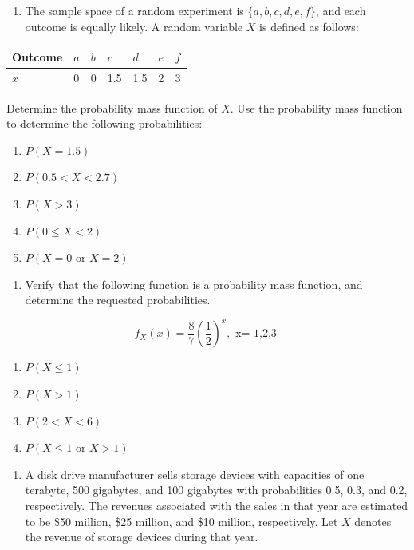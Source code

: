 \documentclass[]{book}
\providecommand{\tightlist}{%
  \setlength{\itemsep}{0pt}\setlength{\parskip}{0pt}}
\begin{document}
\begin{enumerate}
\def\labelenumi{\arabic{enumi}.}
\setcounter{enumi}{2}
\tightlist
\item
  The sample space of a random experiment is \(\{a, b, c, d, e, f\}\), and each outcome is equally likely. A random variable \(X\) is defined as follows:
\end{enumerate}

\begin{longtable}[]{@{}lllllll@{}}
\toprule
Outcome & \(a\) & \(b\) & \(c\) & \(d\) & \(e\) & \(f\)\tabularnewline
\midrule
\endhead
\(x\) & 0 & 0 & 1.5 & 1.5 & 2 & 3\tabularnewline
\bottomrule
\end{longtable}

Determine the probability mass function of \(X\). Use the probability mass function to determine the following probabilities:

\begin{enumerate}
\def\labelenumi{(\alph{enumi})}
\tightlist
\item
  \(P(X = 1.5)\)
\item
  \(P(0.5 < X < 2.7)\)
\item
  \(P(X > 3)\)
\item
  \(P(0 \leq X < 2)\)
\item
  \(P(X = 0 \text{ or } X = 2)\)
\end{enumerate}

\begin{enumerate}
\def\labelenumi{\arabic{enumi}.}
\setcounter{enumi}{3}
\tightlist
\item
  Verify that the following function is a probability mass function, and determine the requested probabilities.
\end{enumerate}

\[f_X(x)=\frac{8}{7} \left(\frac{1}{2} \right)^x, \text{ x= 1,2,3 }\]

\begin{enumerate}
\def\labelenumi{(\alph{enumi})}
\tightlist
\item
  \(P(X \leq 1)\)
\item
  \(P(X > 1)\)
\item
  \(P (2 < X < 6)\)
\item
  \(P(X \leq 1 \text{ or } X > 1)\)
\end{enumerate}

\begin{enumerate}
\def\labelenumi{\arabic{enumi}.}
\setcounter{enumi}{4}
\tightlist
\item
  A disk drive manufacturer sells storage devices with capacities of one terabyte, 500 gigabytes, and 100 gigabytes with probabilities 0.5, 0.3, and 0.2, respectively. The revenues associated with the sales in that year are estimated to be \$50 million, \$25 million, and \$10 million, respectively. Let \(X\) denotes the revenue of storage devices during that year.
\end{enumerate}
\end{document}
